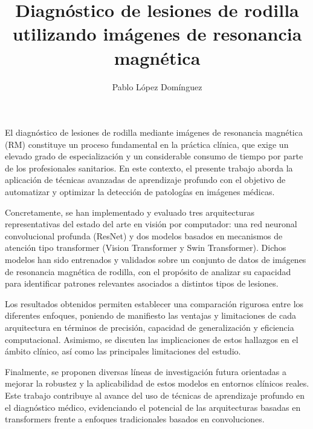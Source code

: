 \documentclass[twoside,spanish,a4paper,12pt]{tfg}
\title{Diagnóstico de lesiones de rodilla utilizando imágenes de resonancia magnética}
\author{Pablo López Domínguez}
\begin{document}
\portada
\cleardoublepage
\contraportada
\cleardoublepage
\declaracion
\cleardoublepage


\begin{resumen}
El diagnóstico de lesiones de rodilla mediante imágenes de resonancia magnética (RM) constituye un proceso fundamental en la práctica clínica, que exige un elevado grado de especialización y un considerable consumo de tiempo por parte de los profesionales sanitarios. En este contexto, el presente trabajo aborda la aplicación de técnicas avanzadas de aprendizaje profundo con el objetivo de automatizar y optimizar la detección de patologías en imágenes médicas.

Concretamente, se han implementado y evaluado tres arquitecturas representativas del estado del arte en visión por computador: una red neuronal convolucional profunda (ResNet) y dos modelos basados en mecanismos de atención tipo transformer (Vision Transformer y Swin Transformer). Dichos modelos han sido entrenados y validados sobre un conjunto de datos de imágenes de resonancia magnética de rodilla, con el propósito de analizar su capacidad para identificar patrones relevantes asociados a distintos tipos de lesiones.

Los resultados obtenidos permiten establecer una comparación rigurosa entre los diferentes enfoques, poniendo de manifiesto las ventajas y limitaciones de cada arquitectura en términos de precisión, capacidad de generalización y eficiencia computacional. Asimismo, se discuten las implicaciones de estos hallazgos en el ámbito clínico, así como las principales limitaciones del estudio.

Finalmente, se proponen diversas líneas de investigación futura orientadas a mejorar la robustez y la aplicabilidad de estos modelos en entornos clínicos reales. Este trabajo contribuye al avance del uso de técnicas de aprendizaje profundo en el diagnóstico médico, evidenciando el potencial de las arquitecturas basadas en transformers frente a enfoques tradicionales basados en convoluciones.
\end{resumen}
\cleardoublepage
\end{document}
